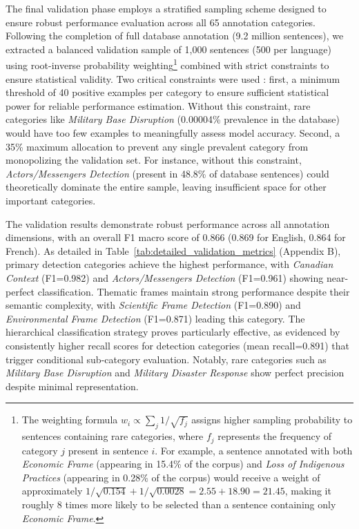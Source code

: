 The final validation phase employs a stratified sampling scheme designed to ensure robust performance evaluation across all 65 annotation categories. Following the completion of full database annotation (9.2 million sentences), we extracted a balanced validation sample of 1,000 sentences (500 per language) using root-inverse probability weighting\footnote{The weighting formula $w_i \propto \sum_j 1/\sqrt{f_j}$ assigns higher sampling probability to sentences containing rare categories, where $f_j$ represents the frequency of category $j$ present in sentence $i$. For example, a sentence annotated with both \textit{Economic Frame} (appearing in 15.4\% of the corpus) and \textit{Loss of Indigenous Practices} (appearing in 0.28\% of the corpus) would receive a weight of approximately $1/\sqrt{0.154} + 1/\sqrt{0.0028} = 2.55 + 18.90 = 21.45$, making it roughly 8 times more likely to be selected than a sentence containing only \textit{Economic Frame}.} combined with strict constraints to ensure statistical validity. Two critical constraints were used : first, a minimum threshold of 40 positive examples per category to ensure sufficient statistical power for reliable performance estimation. Without this constraint, rare categories like \textit{Military Base Disruption} (0.00004\% prevalence in the database) would have too few examples to meaningfully assess model accuracy. Second, a 35\% maximum allocation to prevent any single prevalent category from monopolizing the validation set. For instance, without this constraint, \textit{Actors/Messengers Detection} (present in 48.8\% of database sentences) could theoretically dominate the entire sample, leaving insufficient space for other important categories.

The validation results demonstrate robust performance across all annotation dimensions, with an overall F1 macro score of 0.866 (0.869 for English, 0.864 for French). As detailed in Table~\ref{tab:detailed_validation_metrics} (Appendix B), primary detection categories achieve the highest performance, with \textit{Canadian Context} (F1=0.982) and \textit{Actors/Messengers Detection} (F1=0.961) showing near-perfect classification. Thematic frames maintain strong performance despite their semantic complexity, with \textit{Scientific Frame Detection} (F1=0.890) and \textit{Environmental Frame Detection} (F1=0.871) leading this category. The hierarchical classification strategy proves particularly effective, as evidenced by consistently higher recall scores for detection categories (mean recall=0.891) that trigger conditional sub-category evaluation. Notably, rare categories such as \textit{Military Base Disruption} and \textit{Military Disaster Response} show perfect precision despite minimal representation.

